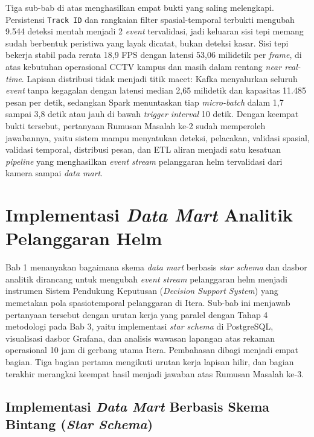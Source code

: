 Tiga sub-bab di atas menghasilkan empat bukti yang saling melengkapi. Persistensi \texttt{Track ID} dan rangkaian filter spasial-temporal terbukti mengubah 9.544 deteksi mentah menjadi 2 \textit{event} tervalidasi, jadi keluaran sisi tepi memang sudah berbentuk peristiwa yang layak dicatat, bukan deteksi kasar. Sisi tepi bekerja stabil pada rerata 18,9 FPS dengan latensi 53,06 milidetik per \textit{frame}, di atas kebutuhan operasional CCTV kampus dan masih dalam rentang \textit{near real-time}. Lapisan distribusi tidak menjadi titik macet: Kafka menyalurkan seluruh \textit{event} tanpa kegagalan dengan latensi median 2,65 milidetik dan kapasitas 11.485 pesan per detik, sedangkan Spark menuntaskan tiap \textit{micro-batch} dalam 1,7 sampai 3,8 detik atau jauh di bawah \textit{trigger interval} 10 detik. Dengan keempat bukti tersebut, pertanyaan Rumusan Masalah ke-2 sudah memperoleh jawabannya, yaitu sistem mampu menyatukan deteksi, pelacakan, validasi spasial, validasi temporal, distribusi pesan, dan ETL aliran menjadi satu kesatuan \textit{pipeline} yang menghasilkan \textit{event stream} pelanggaran helm tervalidasi dari kamera sampai \textit{data mart}.
\section{Implementasi \textit{Data Mart} Analitik Pelanggaran Helm}
\label{sec:data-mart}

Bab 1 menanyakan bagaimana skema \textit{data mart} berbasis \textit{star schema} dan dasbor analitik dirancang untuk mengubah \textit{event stream} pelanggaran helm menjadi instrumen Sistem Pendukung Keputusan (\textit{Decision Support System}) yang memetakan pola spasiotemporal pelanggaran di Itera. Sub-bab ini menjawab pertanyaan tersebut dengan urutan kerja yang paralel dengan Tahap 4 metodologi pada Bab 3, yaitu implementasi \textit{star schema} di PostgreSQL, visualisasi dasbor Grafana, dan analisis wawasan lapangan atas rekaman operasional 10 jam di gerbang utama Itera. Pembahasan dibagi menjadi empat bagian. Tiga bagian pertama mengikuti urutan kerja lapisan hilir, dan bagian terakhir merangkai keempat hasil menjadi jawaban atas Rumusan Masalah ke-3.
\subsection{Implementasi \textit{Data Mart} Berbasis Skema Bintang (\textit{Star Schema})}
\label{subsec:implementasi-star-schema}

